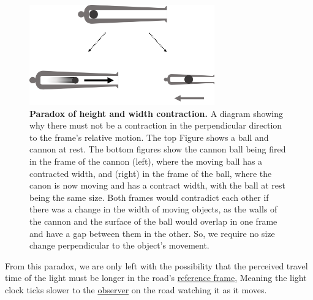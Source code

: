 \begin{figure}[H]
	\centering
	\includegraphics[width = 8cm]{images/pdf/Cannon_Balls.pdf}
	\caption{\textbf{Paradox of height and width contraction.} A diagram showing why there must not be a contraction in the perpendicular direction to the frame's relative motion. The top Figure shows a ball and cannon at rest. The bottom figures show the cannon ball being fired in the frame of the cannon (left), where the moving ball has a contracted width, and (right) in the frame of the ball, where the canon is now moving and has a contract width, with the ball at rest being the same size. Both frames would contradict each other if there was a change in the width of moving objects, as the walls of the cannon and the surface of the ball would overlap in one frame and have a gap between them in the other. So, we require no size change perpendicular to the object's movement.}
	\label{fig: width contraction}
\end{figure}


From this paradox, we are only left with the possibility that the perceived travel time of the light must be longer in the road's \hyperlink{def-Reference-frame}{reference frame}, Meaning the light clock ticks slower to the \hyperlink{def-observer}{observer} on the road watching it as it moves.

